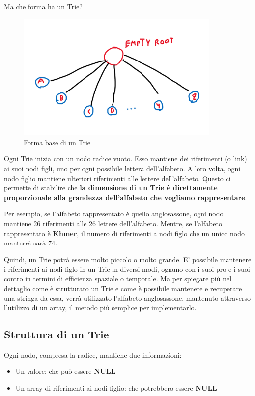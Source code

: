 \documentclass[a4paper, 12pt]{article}
\begin{document}
Ma che forma ha un Trie?

\clearpage
\begin{figure}[ht!]
    \centering
    \includegraphics[width=10cm]{Images/shape trie.png}
    \caption{Forma base di un Trie}
    \label{fig:my_label}
\end{figure}

Ogni Trie inizia con un nodo radice vuoto. Esso mantiene dei riferimenti (o link) ai suoi nodi figli, uno per ogni possibile lettera dell'alfabeto. A loro volta, ogni nodo figlio mantiene ulteriori riferimenti alle lettere dell'alfabeto. Questo ci permette di stabilire che \textbf{la dimensione di un Trie è direttamente proporzionale alla grandezza dell'alfabeto che vogliamo rappresentare}.

Per esempio, se l'alfabeto rappresentato è quello anglosassone, ogni nodo mantiene 26 riferimenti alle 26 lettere dell'alfabeto. Mentre, se l'alfabeto rappresentato è \textbf{Khmer}, il numero di riferimenti a nodi figlo che un unico nodo manterrà sarà 74.

Quindi, un Trie potrà essere molto piccolo o molto grande. E' possibile mantenere i riferimenti ai nodi figlo in un Trie in diversi modi, ognuno con i suoi pro e i suoi contro in termini di efficienza spaziale o temporale. Ma per spiegare più nel dettaglio come è strutturato un Trie e come è possibile mantenere e recuperare una stringa da essa, verrà utilizzato l'alfabeto anglosassone, mantenuto attraverso l'utilizzo di un array, il metodo più semplice per implementarlo.

\clearpage
\subsection{Struttura di un Trie}
Ogni nodo, compresa la radice, mantiene due informazioni:
\begin{itemize}
    \item Un valore: che può essere \textbf{NULL}
    \item Un array di riferimenti ai nodi figlio: che potrebbero essere \textbf{NULL}
\end{itemize}
\end{document}
